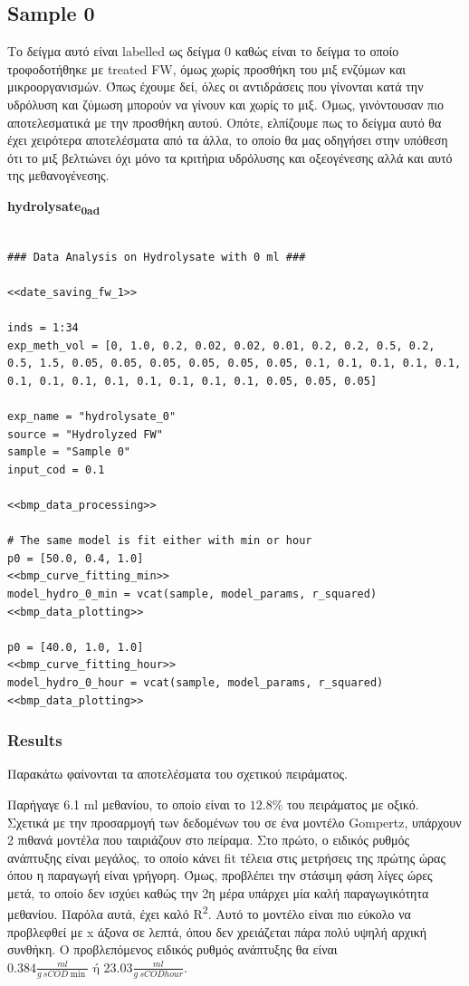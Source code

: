 \documentclass[11pt]{article}
\begin{document}
\subsection{Sample 0}
\label{sec:org5c92806}
Το δείγμα αυτό είναι labelled ως δείγμα 0 καθώς είναι το δείγμα το οποίο τροφοδοτήθηκε με treated FW, όμως χωρίς προσθήκη του μιξ ενζύμων και μικροοργανισμών. Όπως έχουμε δεί, όλες οι αντιδράσεις που γίνονται κατά την υδρόλυση και ζύμωση μπορούν να γίνουν και χωρίς το μιξ. Όμως, γινόντουσαν πιο αποτελεσματικά με την προσθήκη αυτού. Οπότε, ελπίζουμε πως το δείγμα αυτό θα έχει χειρότερα αποτελέσματα από τα άλλα, το οποίο θα μας οδηγήσει στην υπόθεση ότι το μιξ βελτιώνει όχι μόνο τα κριτήρια υδρόλυσης και οξεογένεσης αλλά και αυτό της μεθανογένεσης.

\textbf{hydrolysate\textsubscript{0}\textsubscript{ad}}
\begin{verbatim}

### Data Analysis on Hydrolysate with 0 ml ###

<<date_saving_fw_1>>

inds = 1:34
exp_meth_vol = [0, 1.0, 0.2, 0.02, 0.02, 0.01, 0.2, 0.2, 0.5, 0.2, 0.5, 1.5, 0.05, 0.05, 0.05, 0.05, 0.05, 0.05, 0.1, 0.1, 0.1, 0.1, 0.1, 0.1, 0.1, 0.1, 0.1, 0.1, 0.1, 0.1, 0.1, 0.05, 0.05, 0.05]

exp_name = "hydrolysate_0"
source = "Hydrolyzed FW"
sample = "Sample 0"
input_cod = 0.1

<<bmp_data_processing>>

# The same model is fit either with min or hour
p0 = [50.0, 0.4, 1.0]
<<bmp_curve_fitting_min>>
model_hydro_0_min = vcat(sample, model_params, r_squared)
<<bmp_data_plotting>>

p0 = [40.0, 1.0, 1.0]
<<bmp_curve_fitting_hour>>
model_hydro_0_hour = vcat(sample, model_params, r_squared)
<<bmp_data_plotting>>
\end{verbatim}

\subsubsection{Results}
\label{sec:org14bddc7}
Παρακάτω φαίνονται τα αποτελέσματα του σχετικού πειράματος.

Παρήγαγε 6.1 ml μεθανίου, το οποίο είναι το \(12.8 \%\) του πειράματος με οξικό. Σχετικά με την προσαρμογή των δεδομένων του σε ένα μοντέλο Gompertz, υπάρχουν 2 πιθανά μοντέλα που ταιριάζουν στο πείραμα. Στο πρώτο, ο ειδικός ρυθμός ανάπτυξης είναι μεγάλος, το οποίο κάνει fit τέλεια στις μετρήσεις της πρώτης ώρας όπου η παραγωγή είναι γρήγορη. Όμως, προβλέπει την στάσιμη φάση λίγες ώρες μετά, το οποίο δεν ισχύει καθώς την 2η μέρα υπάρχει μία καλή παραγωγικότητα μεθανίου. Παρόλα αυτά, έχει καλό R\textsuperscript{2}. Αυτό το μοντέλο είναι πιο εύκολο να προβλεφθεί με x άξονα σε λεπτά, όπου δεν χρειάζεται πάρα πολύ υψηλή αρχική συνθήκη. Ο προβλεπόμενος ειδικός ρυθμός ανάπτυξης θα είναι \(0.384 \frac{ml}{g ~ sCOD \min } \text{ ή } 23.03 \frac{ml}{g ~ sCOD hour}\).
\end{document}
